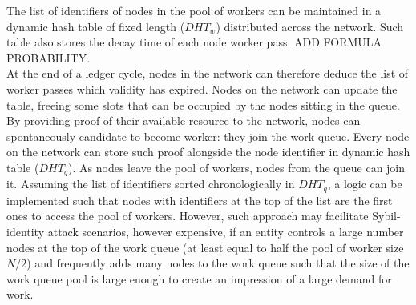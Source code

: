 The list of identifiers of nodes in the pool of workers can be maintained in a dynamic hash table of fixed length ($DHT_w$) distributed across the network. Such table also stores the decay time of each node worker pass. ADD FORMULA PROBABILITY.\\
At the end of a ledger cycle, nodes in the network can therefore deduce the list of worker passes which validity has expired. Nodes on the network can update the table, freeing some slots that can be occupied by the nodes sitting in the queue. \\

By providing proof of their available resource to the network, nodes can spontaneously candidate to become worker: they join the work queue. Every node on the network can store such proof alongside the node identifier in dynamic hash table ($DHT_q$). As nodes leave the pool of workers, nodes from the queue can join it. Assuming the list of identifiers sorted chronologically in $DHT_q$, a logic can be implemented such that nodes with identifiers at the top of the list are the first ones to access the pool of workers. However, such approach may facilitate Sybil-identity attack scenarios, however expensive, if an entity controls a large number nodes at the top of the work queue (at least equal to half the pool of worker size $N/2$) and frequently adds many nodes to the work queue such that the size of the work queue pool is large enough to create an impression of a large demand for work.\\

